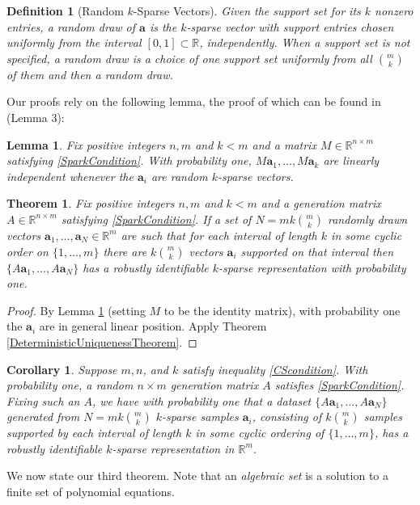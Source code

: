 \documentclass[journal, onecolumn]{IEEEtran}
\newtheorem{theorem}{Theorem}
\newtheorem{lemma}{Lemma}
\newtheorem{definition}{Definition}
\newtheorem{corollary}{Corollary}
\begin{document}
\begin{definition}[Random $k$-Sparse Vectors]\label{RandomDraw}
Given the support set for its $k$ nonzero entries, a random draw of $\mathbf{a}$ is the $k$-sparse vector with support entries chosen uniformly from the interval $[0, 1] \subset \mathbb{R}$, independently. When a support set is not specified, a random draw is a choice of one support set uniformly from all ${m \choose k}$ of them and then a random draw.
\end{definition}

Our proofs rely on the following lemma, the proof of which can be found in \cite{Hillar15} (Lemma 3):
\begin{lemma}\label{Hillar15lemma2}
Fix positive integers $n, m$ and $k < m$ and a matrix $M \in \mathbb{R}^{n \times m}$ satisfying \eqref{SparkCondition}. With probability one, $M\mathbf{a}_1, \ldots, M\mathbf{a}_k$ are linearly independent whenever the $\mathbf{a}_i$ are random $k$-sparse vectors.
\end{lemma}

\begin{theorem}\label{Theorem2}
Fix positive integers $n, m$ and $k < m$ and a generation matrix $A \in \mathbb{R}^{n \times m}$ satisfying \eqref{SparkCondition}. If a set of $N = mk{m \choose k}$ randomly drawn vectors $\mathbf{a}_1, \ldots, \mathbf{a}_N \in \mathbb{R}^m$ are such that for each interval of length $k$ in some cyclic order on $\{1, \ldots, m\}$ there are $k{m \choose k}$ vectors $\mathbf{a}_i$ supported on that interval then $\{A\mathbf{a}_1, \ldots, A\mathbf{a}_N\}$ has a robustly identifiable $k$-sparse representation with probability one.
\end{theorem}

\begin{proof}
By Lemma \ref{Hillar15lemma2} (setting $M$ to be the identity matrix), with probability one the $\mathbf{a}_i$ are in general linear position. Apply Theorem \ref{DeterministicUniquenessTheorem}.
\end{proof} 

\begin{corollary}
Suppose $m, n$, and $k$ satisfy inequality \eqref{CScondition}. With probability one, a random $n \times m$ generation matrix $A$ satisfies \eqref{SparkCondition}. Fixing such an $A$, we have with probability one that a dataset $\{A\mathbf{a}_1, \ldots , A\mathbf{a}_N\}$ generated from $N = mk{m \choose k}$ $k$-sparse samples $\mathbf{a}_i$, consisting of $k{m \choose k}$ samples supported by each interval of length $k$ in some cyclic ordering of $\{1, \ldots, m\}$, has a robustly identifiable $k$-sparse representation in $\mathbb{R}^m$.
\end{corollary}
We now state our third theorem. Note that an \emph{algebraic set} is a solution to a finite set of polynomial equations. 
\end{document}
